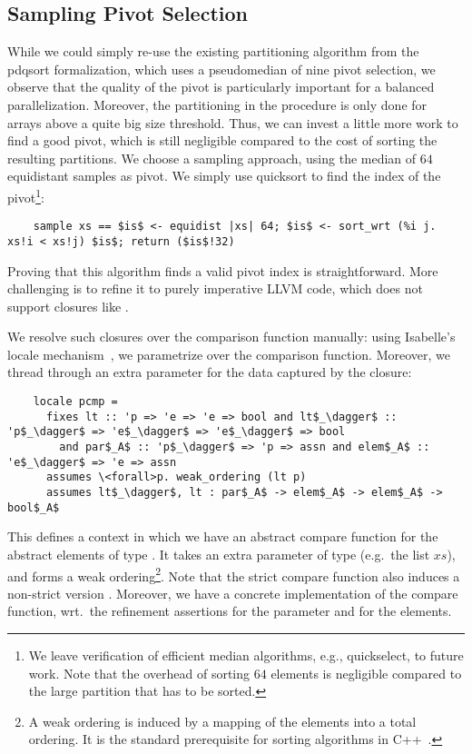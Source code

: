 \documentclass[sn-mathphys,Numbered]{sn-jnl}
\theoremstyle{thmstyleone}%
\theoremstyle{definition}%
\theoremstyle{thmstylethree}%
\begin{document}
  \subsection{Sampling Pivot Selection}
  While we could simply re-use the existing partitioning algorithm from the pdqsort formalization,
  which uses a pseudomedian of nine pivot selection, we observe that the quality of the pivot is
  particularly important for a balanced parallelization. Moreover, the partitioning in the  procedure
  is only done for arrays above a quite big size threshold. Thus, we can invest a little more work to find
  a good pivot, which is still negligible compared to the cost of sorting the resulting partitions.
  We choose a sampling approach, using the median of $64$ equidistant samples as pivot.
  We simply use quicksort to find the index of the pivot\footnote{
  We leave verification of efficient median algorithms, e.g., quickselect, to future work. Note that the overhead of sorting $64$ elements is negligible compared to the large partition that has to be sorted.}:
  \begin{lstlisting}
    sample xs == $is$ <- equidist |xs| 64; $is$ <- sort_wrt (%i j. xs!i < xs!j) $is$; return ($is$!32)
  \end{lstlisting}
  Proving that this algorithm finds a valid pivot index is straightforward. More challenging is to refine it to
  purely imperative LLVM code, which does not support closures like .

  We resolve such closures over the comparison function manually: using Isabelle's locale mechanism~\cite{KWP99},
  we parametrize over the comparison function. Moreover, we thread through an extra parameter for the data
  captured by the closure:
  \begin{lstlisting}
    locale pcmp =
      fixes lt :: 'p => 'e => 'e => bool and lt$_\dagger$ :: 'p$_\dagger$ => 'e$_\dagger$ => 'e$_\dagger$ => bool
        and par$_A$ :: 'p$_\dagger$ => 'p => assn and elem$_A$ :: 'e$_\dagger$ => 'e => assn
      assumes \<forall>p. weak_ordering (lt p)
      assumes lt$_\dagger$, lt : par$_A$ -> elem$_A$ -> elem$_A$ -> bool$_A$
  \end{lstlisting}
  This defines a context in which we have an abstract compare function  for the abstract elements of type .
  It takes an extra parameter of type  (e.g.\ the list $xs$), and forms a weak ordering\footnote{
    A weak ordering is induced by a mapping of the elements into a total ordering. It is the standard prerequisite for sorting algorithms in C++~\cite{Josu12}.
  }. Note that the strict compare function  also induces a non-strict version .
  Moreover, we have a concrete implementation  of the compare function, wrt.\ the refinement assertions
   for the parameter and  for the elements.
\end{document}
